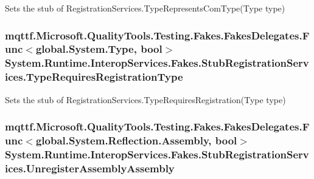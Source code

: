 Sets the stub of Registration\-Services.\-Type\-Represents\-Com\-Type(\-Type type)

\hypertarget{class_system_1_1_runtime_1_1_interop_services_1_1_fakes_1_1_stub_registration_services_ac8311bd6036544eba7f4b357de2fee38}{
\subsubsection[{Type\-Requires\-Registration\-Type}]{\setlength{\rightskip}{0pt plus 5cm}mqttf.\-Microsoft.\-Quality\-Tools.\-Testing.\-Fakes.\-Fakes\-Delegates.\-Func$<$global.\-System.\-Type, bool$>$ System.\-Runtime.\-Interop\-Services.\-Fakes.\-Stub\-Registration\-Services.\-Type\-Requires\-Registration\-Type}}\label{class_system_1_1_runtime_1_1_interop_services_1_1_fakes_1_1_stub_registration_services_ac8311bd6036544eba7f4b357de2fee38}


Sets the stub of Registration\-Services.\-Type\-Requires\-Registration(\-Type type)

\hypertarget{class_system_1_1_runtime_1_1_interop_services_1_1_fakes_1_1_stub_registration_services_a954dabab7ad529cd8169c57faec4ac21}{
\subsubsection[{Unregister\-Assembly\-Assembly}]{\setlength{\rightskip}{0pt plus 5cm}mqttf.\-Microsoft.\-Quality\-Tools.\-Testing.\-Fakes.\-Fakes\-Delegates.\-Func$<$global.\-System.\-Reflection.\-Assembly, bool$>$ System.\-Runtime.\-Interop\-Services.\-Fakes.\-Stub\-Registration\-Services.\-Unregister\-Assembly\-Assembly}}\label{class_system_1_1_runtime_1_1_interop_services_1_1_fakes_1_1_stub_registration_services_a954dabab7ad529cd8169c57faec4ac21}


